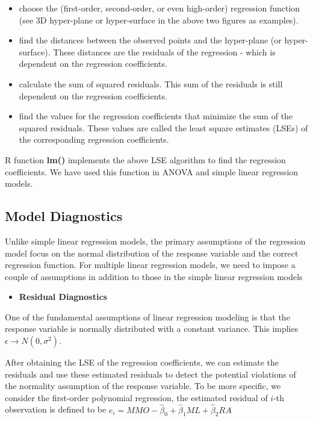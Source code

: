\documentclass[
]{book}
\providecommand{\tightlist}{%
  \setlength{\itemsep}{0pt}\setlength{\parskip}{0pt}}
\begin{document}
\begin{itemize}
\item
  choose the (first-order, second-order, or even high-order) regression function (see 3D hyper-plane or hyper-surface in the above two figures as examples).
\item
  find the distances between the observed points and the hyper-plane (or hyper-surface). These distances are the residuals of the regression - which is dependent on the regression coefficients.
\item
  calculate the sum of squared residuals. This sum of the residuals is still dependent on the regression coefficients.
\item
  find the values for the regression coefficients that minimize the sum of the squared residuals. These values are called the least square estimates (LSEs) of the corresponding regression coefficients.
\end{itemize}

R function \textbf{lm()} implements the above LSE algorithm to find the regression coefficients. We have used this function in ANOVA and simple linear regression models.

\hypertarget{model-diagnostics}{%
\subsection{Model Diagnostics}\label{model-diagnostics}}

Unlike simple linear regression models, the primary assumptions of the regression model focus on the normal distribution of the response variable and the correct regression function. For multiple linear regression models, we need to impose a couple of assumptions in addition to those in the simple linear regression models

\begin{itemize}
\tightlist
\item
  \textbf{Residual Diagnostics}
\end{itemize}

One of the fundamental assumptions of linear regression modeling is that the response variable is normally distributed with a constant variance. This implies \(\epsilon \to N(0, \sigma^2)\).

After obtaining the LSE of the regression coefficients, we can estimate the residuals and use these estimated residuals to detect the potential violations of the normality assumption of the response variable. To be more specific, we consider the first-order polynomial regression, the estimated residual of \(i\)-th observation is defined to be \(e_i = MMO - \hat{\beta}_0 + \hat{\beta}_1 ML + \hat{\beta}_2 RA\)
\end{document}
